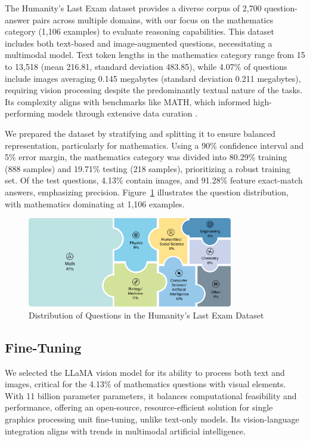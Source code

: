 \documentclass{svproc}
\begin{document}
The Humanity's Last Exam dataset provides a diverse corpus of 2,700 question-answer pairs across multiple domains, with our focus on the mathematics category (1,106 examples) to evaluate reasoning capabilities. This dataset includes both text-based and image-augmented questions, necessitating a multimodal model. Text token lengths in the mathematics category range from 15 to 13,518 (mean 216.81, standard deviation 483.85), while 4.07\% of questions include images averaging 0.145 megabytes (standard deviation 0.211 megabytes), requiring vision processing despite the predominantly textual nature of the tasks. Its complexity aligns with benchmarks like MATH, which informed high-performing models through extensive data curation \cite{hendrycksmath2021,shao2024deepseekmathpushinglimitsmathematical}.

We prepared the dataset by stratifying and splitting it to ensure balanced representation, particularly for mathematics. Using a 90\% confidence interval and 5\% error margin, the mathematics category was divided into 80.29\% training (888 samples) and 19.71\% testing (218 samples), prioritizing a robust training set. Of the test questions, 4.13\% contain images, and 91.28\% feature exact-match answers, emphasizing precision. Figure~\ref{fig:dataset} illustrates the question distribution, with mathematics dominating at 1,106 examples.

\begin{figure}[h]
  \centering
  \includegraphics[width=0.8\textwidth]{.assets/dataset.png}
  \caption{Distribution of Questions in the Humanity's Last Exam Dataset \cite{phan2025humanitysexam}}
  \label{fig:dataset}
\end{figure}

\subsection{Fine-Tuning}

We selected the LLaMA vision model for its ability to process both text and images, critical for the 4.13\% of mathematics questions with visual elements. With 11 billion parameter parameters, it balances computational feasibility and performance, offering an open-source, resource-efficient solution for single graphics processing unit fine-tuning, unlike text-only models. Its vision-language integration aligns with trends in multimodal artificial intelligence.
\end{document}
